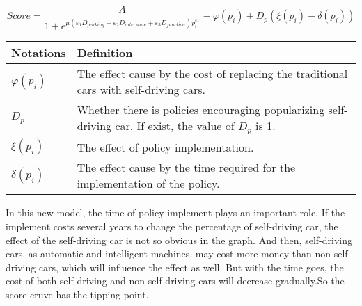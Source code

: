 \documentclass{mcmthesis}
\numberwithin{equation}{section}
\begin{document}
			\begin{equation}
				Score = \frac{A}{1 + e^{\mu(\varepsilon_{1} D_{peaking} + \varepsilon_{2} D_{interstate} + \varepsilon_{3} D_{junction}) p_{i}^{\varepsilon_{4}}}} - \varphi(p_{i}) + D_{p} (\xi(p_{i}) - \delta(p_{i}))
			\end{equation}
			\begin{table}[H]
				\caption{Extra Notations in Expanded Evaluating Model}
				\begin{center}
					\begin{longtable}{m{80pt}<{\centering} | m{280pt}}
						\hline%
						Notations 			& 	Definition \\
						\hline%
						$\varphi(p_{i})$ 	&	The effect cause by the cost of replacing the traditional cars with self-driving cars.\\
						\hline%
						$D_{p}$				&	Whether there is policies encouraging popularizing self-driving car. If exist, the value of $D_{p}$ is 1.\\
						\hline%
						$\xi(p_{i})$		&	The effect of policy implementation.\\
						\hline%
						$\delta(p_{i})$		&	The effect cause by the time required for the implementation of the policy.\\
						\hline%
					\end{longtable}
				\end{center}
			\end{table}
			In this new model, the time of policy implement plays an important role. If the implement costs several years to change the percentage of self-driving car, the effect of the self-driving car is not so obvious in the graph. And then, self-driving cars, as automatic and intelligent machines, may cost more money than non-self-driving cars, which will influence the effect as well. But with the time goes, the cost of both self-driving and non-self-driving cars will decrease gradually.So the score cruve has the tipping point.
\end{document}
